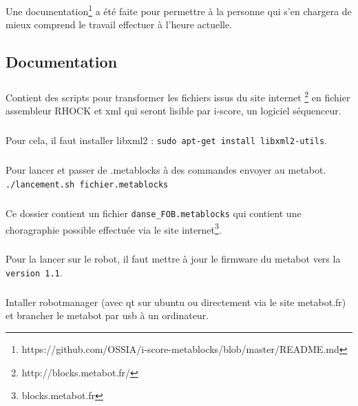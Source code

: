 \documentclass[10pt,a4paper]{report}
\begin{document}
Une documentation\footnote{https://github.com/OSSIA/i-score-metablocks/blob/master/README.md} a été faite pour permettre à la personne qui s'en chargera de mieux comprend le travail effectuer à l'heure actuelle.


\def\appendixpage{\vspace*{8cm} 
\begin{center} 
\Huge\textbf{Annexes} 
\end{center} 
} 
\def\appendixname{Annexe}%

\begin{appendices} 
\chapter{Documentation} 
\paragraph{}
Contient des scripts pour transformer les fichiers issus du site internet \footnote{http://blocks.metabot.fr/} en fichier assembleur RHOCK et xml qui seront lisible par i-score, un logiciel séquenceur.
\paragraph{}
Pour cela, il faut installer libxml2 : 
\texttt{sudo apt-get install libxml2-utils}.
\paragraph{}
Pour lancer et passer de .metablocks à des commandes envoyer au metabot.
\texttt{./lancement.sh fichier.metablocks}
\paragraph{}
Ce dossier contient un fichier \texttt{danse\_FOB.metablocks} qui contient une choragraphie possible effectuée via le site internet\footnote{blocks.metabot.fr}.
\paragraph{}
Pour la lancer sur le robot, il faut mettre à jour le firmware du metabot vers la \texttt{version 1.1}.
\paragraph{}
Intaller robotmanager (avec qt sur ubuntu ou directement via le site metabot.fr) et brancher le metabot par usb à un ordinateur.

\end{appendices}
\end{document}
